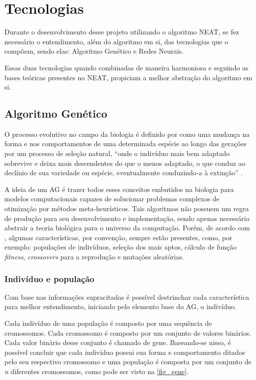 \chapter{Tecnologias}

Durante o desenvolvimento desse projeto utilizando o algoritmo NEAT, se fez 
necessário o entendimento, além do algoritmo em si, das tecnologias que o compõem,
sendo elas: Algoritmo Genético e Redes Neurais. 

Essas duas tecnologias quando combinadas de maneira harmoniosa e 
seguindo as bases teóricas presentes no NEAT, propiciam a melhor abstração do 
algoritmo em si.

\section{Algoritmo Gen{\'e}tico}

O processo evolutivo no campo da biologia é definido por
 como uma mudança na forma e
nos comportamentos de uma determinada espécie ao longo das
gerações por um processo de seleção natural, “onde o indivíduo
mais bem adaptado sobrevive e deixa mais descendentes do que o
menos adaptado, o que conduz ao declínio de sua variedade ou
espécie, eventualmente conduzindo-a à extinção”
\cite{do2009alfred}.

A ideia de um AG é trazer todos esses conceitos embutidos na
biologia para modelos computacionais capazes de solucionar
problemas complexos de otimização por métodos
meta-heurísticos. Tais algoritmos não possuem um regra de
produção para seu desenvolvimento e implementação, sendo
apenas necessário abstrair a teoria biológica para o universo
da computação. Porém, de acordo com
, algumas
características, por convenção, sempre estão presentes, como,
por exemplo: populações de indivíduos, seleção dos mais aptos,
cálculo de função \textit{fitness}, \textit{crossovers} para a reprodução e
mutações aleatórias.

\subsection{Indiv{\'i}duo e popula{\c c}{\~a}o}

Com base nas informações supracitadas é possível destrinchar
cada característica para melhor entendimento, iniciando pelo
elemento base do AG, o indivíduo.

Cada indivíduo de uma população é composto por uma sequência
de cromossomos. Cada cromossomo é composto por um conjunto de
valores binários. Cada valor binário desse conjunto é chamado
de gene. Baseando-se nisso, é possível concluir que cada
indivíduo possui sua forma e comportamento ditados pelo seu
respectivo cromossomo e uma população é composta por um
conjunto de \textit{n} diferentes cromossomos, como pode ser visto na
\autoref{fig_gene}.


